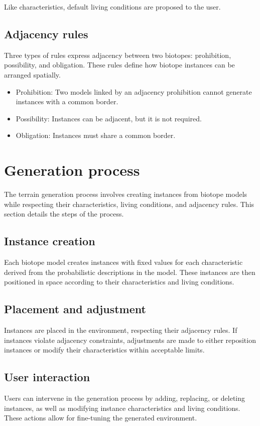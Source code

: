 Like characteristics, default living conditions are proposed to the user.

\subsection{Adjacency rules}
Three types of rules express adjacency between two biotopes: prohibition, possibility, and obligation. These rules define how biotope instances can be arranged spatially.

\begin{itemize}
	\item Prohibition: Two models linked by an adjacency prohibition cannot generate instances with a common border.
	\item Possibility: Instances can be adjacent, but it is not required.
	\item Obligation: Instances must share a common border.
\end{itemize}

\section{Generation process}
The terrain generation process involves creating instances from biotope models while respecting their characteristics, living conditions, and adjacency rules. This section details the steps of the process.

\subsection{Instance creation}
Each biotope model creates instances with fixed values for each characteristic derived from the probabilistic descriptions in the model. These instances are then positioned in space according to their characteristics and living conditions.

\subsection{Placement and adjustment}
Instances are placed in the environment, respecting their adjacency rules. If instances violate adjacency constraints, adjustments are made to either reposition instances or modify their characteristics within acceptable limits.

\subsection{User interaction}
Users can intervene in the generation process by adding, replacing, or deleting instances, as well as modifying instance characteristics and living conditions. These actions allow for fine-tuning the generated environment.

